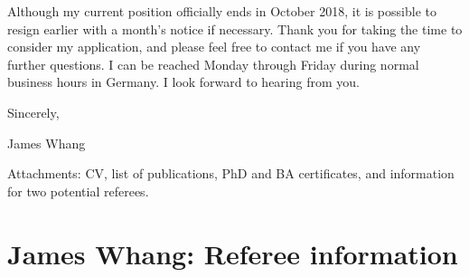 \documentclass[a4paper,11pt]{article}
\begin{document}
\noindent Although my current position officially ends in October 2018, it is possible to resign earlier with a month's notice if necessary. Thank you for taking the time to consider my application, and please feel free to contact me if you have any further questions. I can be reached Monday through Friday during normal business hours in Germany. I look forward to hearing from you.

\vspace{2mm}

\noindent Sincerely,

\vspace{12mm}

\noindent James Whang

\vspace{2mm}

\noindent Attachments: CV, list of publications, PhD and BA certificates, and information for two potential referees.


\pagebreak
\setcounter{page}{1}

\section*{James Whang: Referee information}

\noindent\begin{minipage}[t]{1\textwidth}
\end{minipage}
\end{document}
